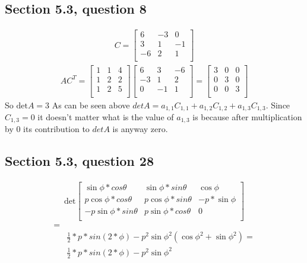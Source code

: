 \documentclass[a4paper,11pt]{article}
\begin{document}
\subsection*{Section 5.3, question 8}
\begin{align*}
C =
\begin{bmatrix}
6 & -3 & 0 \\
3 & 1 & -1 \\
-6 & 2 & 1 \\
\end{bmatrix}
\end{align*}
\begin{align*}
AC^T =
\begin{bmatrix}
1 & 1 & 4 \\
1 & 2 & 2 \\
1 & 2 & 5 \\
\end{bmatrix}
\begin{bmatrix}
6 & 3 & -6 \\
-3 & 1 & 2 \\
0 & -1 & 1 \\
\end{bmatrix}
=
\begin{bmatrix}
3 & 0 & 0 \\
0 & 3 & 0 \\
0 & 0 & 3 \\
\end{bmatrix}
\end{align*}
So $\text{det}A=3$
As can be seen above $det A = a_{1,1}C_{1,1}+a_{1,2}C_{1,2}+a_{1,3}C_{1,3}$. Since $C_{1,3}=0$ it doesn't matter what is the value of $a_{1,3}$ is because after multiplication by $0$ its contribution to $det A$ is anyway zero.
\subsection*{Section 5.3, question 28}
\begin{align*}
\text{det}
\begin{bmatrix}
\sin{\phi}*cos{\theta} & \sin{\phi}*sin{\theta} & \cos{\phi} \\
p\cos{\phi}*cos{\theta} & p\cos{\phi}*sin{\theta} & -p*\sin{\phi} \\
-p\sin{\phi}*sin{\theta} & p\sin{\phi}*cos{\theta} & 0 \\
\end{bmatrix}
\end{align*}
\begin{align*}
= \\
&\frac{1}{2}*p*sin(2*\phi)-p^2\sin{\phi}^2(\cos{\phi}^2+\sin{\phi}^2)=\\
&\frac{1}{2}*p*sin(2*\phi)-p^2\sin{\phi}^2
\end{align*}
\end{document}
